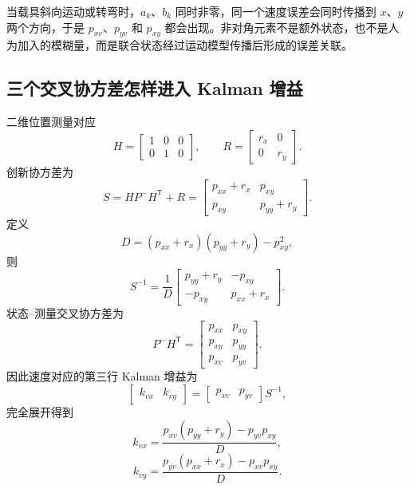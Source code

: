 \documentclass[UTF8,a4paper,11pt]{ctexart}
\newcommand{\prior}{^{-}}
\newcommand{\transpose}{^{\mathsf T}}
\begin{document}
当载具斜向运动或转弯时，$a_k$、$b_k$ 同时非零，同一个速度误差会同时传播到 $x$、$y$ 两个方向，于是 $p_{xv}$、$p_{yv}$ 和 $p_{xy}$ 都会出现。非对角元素不是额外状态，也不是人为加入的模糊量，而是联合状态经过运动模型传播后形成的误差关联。

\subsection{三个交叉协方差怎样进入 Kalman 增益}

二维位置测量对应
\begin{equation}
H=
\begin{bmatrix}
1&0&0\\
0&1&0
\end{bmatrix},
\qquad
R=
\begin{bmatrix}
r_x&0\\
0&r_y
\end{bmatrix}.
\end{equation}
创新协方差为
\begin{equation}
S=HP\prior H\transpose+R
=
\begin{bmatrix}
p_{xx}+r_x&p_{xy}\\
p_{xy}&p_{yy}+r_y
\end{bmatrix}.
\end{equation}
定义
\begin{equation}
D=(p_{xx}+r_x)(p_{yy}+r_y)-p_{xy}^2,
\end{equation}
则
\begin{equation}
S^{-1}=\frac{1}{D}
\begin{bmatrix}
p_{yy}+r_y&-p_{xy}\\
-p_{xy}&p_{xx}+r_x
\end{bmatrix}.
\end{equation}
状态--测量交叉协方差为
\begin{equation}
P\prior H\transpose=
\begin{bmatrix}
p_{xx}&p_{xy}\\
p_{xy}&p_{yy}\\
p_{xv}&p_{yv}
\end{bmatrix}.
\end{equation}
因此速度对应的第三行 Kalman 增益为
\begin{equation}
\begin{bmatrix}k_{vx}&k_{vy}\end{bmatrix}
=\begin{bmatrix}p_{xv}&p_{yv}\end{bmatrix}S^{-1},
\end{equation}
完全展开得到
\begin{equation}
\boxed{
k_{vx}
=\frac{p_{xv}(p_{yy}+r_y)-p_{yv}p_{xy}}{D}
},
\end{equation}
\begin{equation}
\boxed{
k_{vy}
=\frac{p_{yv}(p_{xx}+r_x)-p_{xv}p_{xy}}{D}
}.
\end{equation}
\end{document}
